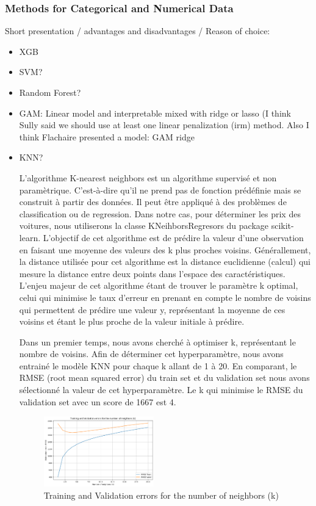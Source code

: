 \documentclass[12pt]{article}
\begin{document}
\subsubsection{Methods for Categorical and Numerical Data}
Short presentation / advantages and disadvantages / Reason of choice:
\begin{itemize}
    \item XGB
    \item SVM?
    \item Random Forest?
    \item GAM: Linear model and interpretable mixed with ridge or lasso (I think Sully said we should use at least one linear penalization  (irm) method. Also I think Flachaire presented a model: GAM ridge
    \item KNN?

L'algorithme K-nearest neighbors est un algorithme supervisé et non paramètrique. C'est-à-dire qu'il ne prend pas de fonction prédéfinie mais se construit à partir des données. Il peut être appliqué à des problèmes de classification ou de regression. Dans notre cas, pour déterminer les prix des voitures, nous utiliserons la classe KNeihborsRegresors du package scikit-learn. 
L'objectif de cet algorithme est de prédire la valeur d'une observation en faisant une moyenne des valeurs des k plus proches voisins. Générallement, la distance utilisée pour cet algorithme est la distance euclidienne (calcul) qui mesure la distance entre deux points dans l'espace des caractéristiques. L'enjeu majeur de cet algorithme étant de trouver le paramètre k optimal, celui qui minimise le taux d'erreur en prenant en compte le nombre de voisins qui permettent de prédire une valeur y, représentant la moyenne de ces voisins et étant le plus proche de la valeur initiale à prédire.

Dans un premier temps, nous avons cherché à optimiser k, représentant le nombre de voisins. Afin de déterminer cet hyperparamètre, nous avons entrainé le modèle KNN pour chaque k allant de 1 à 20. En comparant, le RMSE (root mean squared error) du train set et du validation set nous avons sélectionné la valeur de cet hyperparamètre. Le k qui minimise le RMSE du validation set avec un score de 1667 est 4. 

\FloatBarrier
\begin{figure}[ht]
    \centering
    \includegraphics[width=0.45\textwidth]{Nb k.png}
    \caption{Training and Validation errors for the number of neighbors (k)}
    \label{fig:boxplot}
\end{figure}
\FloatBarrier


\end{itemize}
\end{document}

